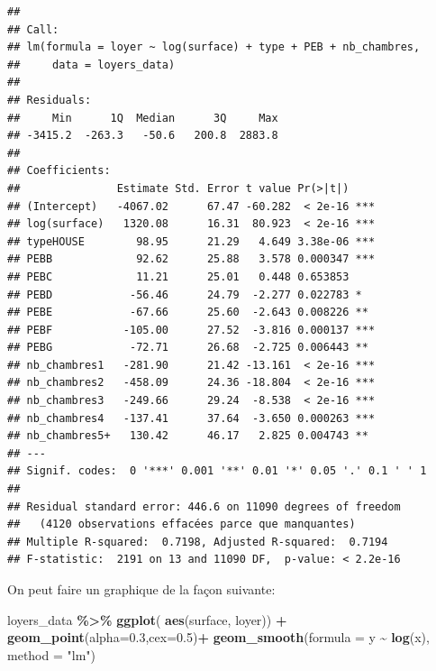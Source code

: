 \documentclass[
]{book}
\newenvironment{Shaded}{\begin{snugshade}}{\end{snugshade}}
\newcommand{\AttributeTok}[1]{\textcolor[rgb]{0.13,0.29,0.53}{#1}}
\newcommand{\FloatTok}[1]{\textcolor[rgb]{0.00,0.00,0.81}{#1}}
\newcommand{\FunctionTok}[1]{\textcolor[rgb]{0.13,0.29,0.53}{\textbf{#1}}}
\newcommand{\NormalTok}[1]{#1}
\newcommand{\SpecialCharTok}[1]{\textcolor[rgb]{0.81,0.36,0.00}{\textbf{#1}}}
\newcommand{\StringTok}[1]{\textcolor[rgb]{0.31,0.60,0.02}{#1}}
\begin{document}
\begin{verbatim}
## 
## Call:
## lm(formula = loyer ~ log(surface) + type + PEB + nb_chambres, 
##     data = loyers_data)
## 
## Residuals:
##     Min      1Q  Median      3Q     Max 
## -3415.2  -263.3   -50.6   200.8  2883.8 
## 
## Coefficients:
##               Estimate Std. Error t value Pr(>|t|)    
## (Intercept)   -4067.02      67.47 -60.282  < 2e-16 ***
## log(surface)   1320.08      16.31  80.923  < 2e-16 ***
## typeHOUSE        98.95      21.29   4.649 3.38e-06 ***
## PEBB             92.62      25.88   3.578 0.000347 ***
## PEBC             11.21      25.01   0.448 0.653853    
## PEBD            -56.46      24.79  -2.277 0.022783 *  
## PEBE            -67.66      25.60  -2.643 0.008226 ** 
## PEBF           -105.00      27.52  -3.816 0.000137 ***
## PEBG            -72.71      26.68  -2.725 0.006443 ** 
## nb_chambres1   -281.90      21.42 -13.161  < 2e-16 ***
## nb_chambres2   -458.09      24.36 -18.804  < 2e-16 ***
## nb_chambres3   -249.66      29.24  -8.538  < 2e-16 ***
## nb_chambres4   -137.41      37.64  -3.650 0.000263 ***
## nb_chambres5+   130.42      46.17   2.825 0.004743 ** 
## ---
## Signif. codes:  0 '***' 0.001 '**' 0.01 '*' 0.05 '.' 0.1 ' ' 1
## 
## Residual standard error: 446.6 on 11090 degrees of freedom
##   (4120 observations effacées parce que manquantes)
## Multiple R-squared:  0.7198, Adjusted R-squared:  0.7194 
## F-statistic:  2191 on 13 and 11090 DF,  p-value: < 2.2e-16
\end{verbatim}

On peut faire un graphique de la façon suivante:

\begin{Shaded}
\begin{Highlighting}[]
\NormalTok{loyers\_data }\SpecialCharTok{\%\textgreater{}\%}
  \FunctionTok{ggplot}\NormalTok{( }\FunctionTok{aes}\NormalTok{(surface, loyer)) }\SpecialCharTok{+}
  \FunctionTok{geom\_point}\NormalTok{(}\AttributeTok{alpha=}\FloatTok{0.3}\NormalTok{,}\AttributeTok{cex=}\FloatTok{0.5}\NormalTok{)}\SpecialCharTok{+}
  \FunctionTok{geom\_smooth}\NormalTok{(}\AttributeTok{formula =}\NormalTok{ y }\SpecialCharTok{\textasciitilde{}} \FunctionTok{log}\NormalTok{(x), }\AttributeTok{method =} \StringTok{"lm"}\NormalTok{)}
\end{Highlighting}
\end{Shaded}
\end{document}
